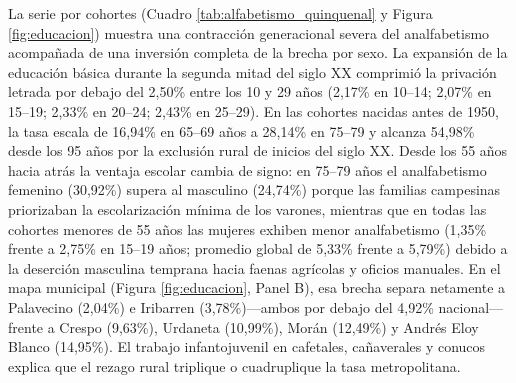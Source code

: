 \documentclass[12pt,letterpaper]{article}
\begin{document}
La serie por cohortes (Cuadro \ref{tab:alfabetismo_quinquenal} y Figura \ref{fig:educacion}) muestra una contracción generacional severa del analfabetismo acompañada de una inversión completa de la brecha por sexo. La expansión de la educación básica durante la segunda mitad del siglo XX comprimió la privación letrada por debajo del 2,50\% entre los 10 y 29 años (2,17\% en 10--14; 2,07\% en 15--19; 2,33\% en 20--24; 2,43\% en 25--29). En las cohortes nacidas antes de 1950, la tasa escala de 16,94\% en 65--69 años a 28,14\% en 75--79 y alcanza 54,98\% desde los 95 años por la exclusión rural de inicios del siglo XX. Desde los 55 años hacia atrás la ventaja escolar cambia de signo: en 75--79 años el analfabetismo femenino (30,92\%) supera al masculino (24,74\%) porque las familias campesinas priorizaban la escolarización mínima de los varones, mientras que en todas las cohortes menores de 55 años las mujeres exhiben menor analfabetismo (1,35\% frente a 2,75\% en 15--19 años; promedio global de 5,33\% frente a 5,79\%) debido a la deserción masculina temprana hacia faenas agrícolas y oficios manuales. En el mapa municipal (Figura \ref{fig:educacion}, Panel B), esa brecha separa netamente a Palavecino (2,04\%) e Iribarren (3,78\%)—ambos por debajo del 4,92\% nacional—frente a Crespo (9,63\%), Urdaneta (10,99\%), Morán (12,49\%) y Andrés Eloy Blanco (14,95\%). El trabajo infantojuvenil en cafetales, cañaverales y conucos explica que el rezago rural triplique o cuadruplique la tasa metropolitana.
\end{document}
